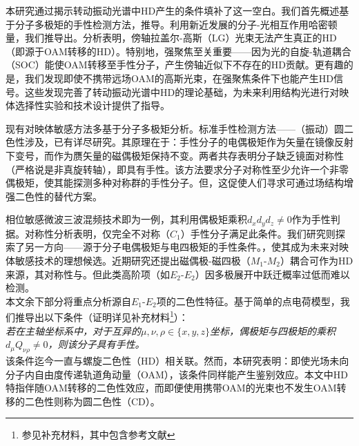\documentclass[reprint,aps,prl,twocolumn,superscriptaddress,groupedaddress]{revtex4-2}
\newcommand{\eomo}{$E_1$-$M_1$}
\newcommand{\eoet}{$E_1$-$E_2$}
\newcommand{\etet}{$E_2$-$E_2$}
\begin{document}
本研究通过揭示转动振动光谱中HD产生的条件填补了这一空白。我们首先概述基于分子多极矩的手性检测方法，推导。利用新近发展的分子-光相互作用哈密顿量\cite{Maslov2024,Maslov_Thesis}，我们推导出。分析表明，傍轴拉盖尔-高斯（LG）光束无法产生真正的HD（即源于OAM转移的HD）。特别地，强聚焦至关重要——因为光的自旋-轨道耦合（SOC）\cite{Bliokh2015}能使OAM转移至手性分子，产生傍轴近似下不存在的HD贡献。更有趣的是，我们发现即使不携带远场OAM的高斯光束，在强聚焦条件下也能产生HD信号。这些发现完善了转动振动光谱中HD的理论基础，为未来利用结构光进行对映体选择性实验和技术设计提供了指导。

现有对映体敏感方法多基于分子多极矩分析。标准手性检测方法——（振动）圆二色性涉及，已有详尽研究\cite{Stephens1985,BUCKINGHAM1987,Mun2019,Lovesey2019}。其原理在于：手性分子的电偶极矩作为矢量在镜像反射下变号，而作为赝矢量的磁偶极矩保持不变。两者共存表明分子缺乏镜面对称性（严格说是非真旋转轴），即具有手性。该方法要求分子对称性至少允许一个非零偶极矩，使其能探测多种对称群的手性分子。但，这促使人们寻求可通过场结构增强二色性的替代方案。

相位敏感微波三波混频技术\cite{Patterson2013,Patterson2013PRL}即为一例，其利用偶极矩乘积$d_xd_yd_z\neq 0$作为手性判据\cite{Patterson2013,Ordonez2018,Ayuso2022}。对称性分析表明，仅完全不对称（$C_1$）手性分子满足此条件。我们研究则探索了另一方向——源于分子电偶极矩与电四极矩的手性条件。，使其成为未来对映体敏感技术的理想候选。近期研究还提出磁偶极-磁四极（$M_1$-$M_2$）耦合可作为HD来源，其对称性与\cite{Ji2024}。但此类高阶项（如\etet）因多极展开中跃迁概率过低而难以检测。\\
本文余下部分将重点分析源自\eoet 项的二色性特征。基于简单的点电荷模型，我们推导出以下条件（证明详见补充材料\footnote{参见补充材料，其中包含参考文献\cite{Maslov2024,Maslov_Thesis,Lax1975,Bliokh2015,Bliokh2023}}）：\\
\textit{若在主轴坐标系中，对于互异的$\mu, \nu, \rho \in \{x,y,z\}$坐标，偶极矩与四极矩的乘积$d_{\mu}Q_{\nu \rho} \neq 0$，则该分子具有手性。}\\
该条件迄今一直与螺旋二色性（HD）相关联\cite{ANDREWS2004,Forbes2018}。然而，本研究表明：即使光场未向分子内自由度传递轨道角动量（OAM），该条件同样能产生鉴别效应。本文中HD特指伴随OAM转移的二色性效应，而即便使用携带OAM的光束也不发生OAM转移的二色性则称为圆二色性（CD）。
\end{document}
